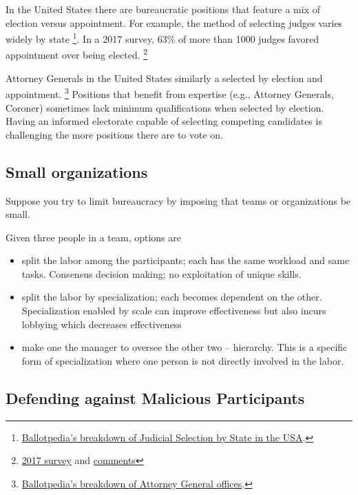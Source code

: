 In the United States there are bureaucratic positions that feature a mix of election versus appointment. For example, the method of selecting judges varies widely by state \footnote{\href{https://ballotpedia.org/Judicial_selection_in_the_states}{Ballotpedia's breakdown of Judicial Selection by State in the USA}.}. In a 2017 survey, 63\% of more than 1000 judges favored appointment over being elected. \footnote{\href{https://www.judges.org/news-and-info/the-age-old-question-should-judges-be-appointed-or-elected-heres-what-you-said/}{2017 survey} and \href{https://www.judges.org/wp-content/uploads/2020/03/Q1_Text.pdf}{comments}}

Attorney Generals in the United States similarly a selected by election and appointment.
\footnote{\href{https://ballotpedia.org/Attorney_General_office_comparison}{Ballotpedia's breakdown of Attorney General offices}.} Positions that benefit from expertise (e.g., Attorney Generals, Coroner) sometimes lack minimum qualifications when selected by election. Having an informed electorate capable of selecting competing candidates is challenging the more positions there are to vote on.

\subsection{Small organizations}

Suppose you try to limit bureaucracy by imposing that teams or organizations be small.

Given three people in a team, options are
\begin{itemize}
    \item split the labor among the participants; each has the same workload and same tasks. Consensus decision making; no exploitation of unique skills.
    \item split the labor by specialization; each becomes dependent on the other. Specialization enabled by scale can improve effectiveness but also incurs lobbying which decreases effectiveness 
    \item make one the manager to oversee the other two -- hierarchy. This is a specific form of specialization where one person is not directly involved in the labor.
\end{itemize}


\subsection{Defending against Malicious Participants}

